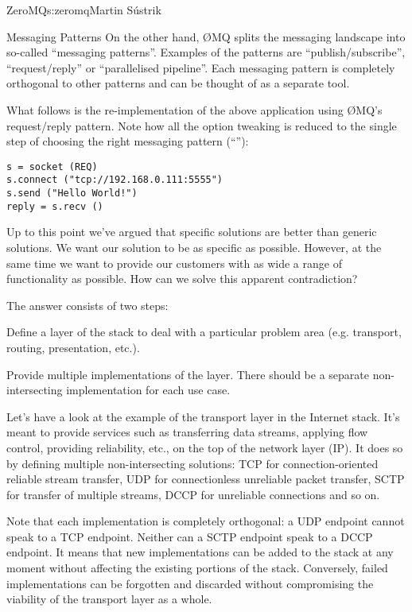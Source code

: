 \begin{aosachapter}{ZeroMQ}{s:zeromq}{Martin S\'{u}strik}
\begin{aosasect1}{Messaging Patterns}
On the other hand, {\O}MQ splits the messaging landscape into so-called ``messaging
patterns''. Examples of the patterns are ``publish/subscribe'',
``request/reply'' or ``parallelised pipeline''. Each messaging pattern
is completely orthogonal to other patterns and can be thought of as a
separate tool.

What follows is the re-implementation of the above application using
{\O}MQ's request/reply pattern. Note how all the option tweaking is
reduced to the single step of choosing the right messaging pattern
(``''):

\begin{verbatim}
s = socket (REQ)
s.connect ("tcp://192.168.0.111:5555")
s.send ("Hello World!")
reply = s.recv ()
\end{verbatim}

Up to this point we've argued that specific solutions are better than
generic solutions. We want our solution to be as specific as
possible. However, at the same time we want to provide our customers
with as wide a range of functionality as possible. How can we solve this
apparent contradiction?

The answer consists of two steps:

\begin{aosaenumerate}

\item Define a layer of the stack to deal with a particular problem
  area (e.g. transport, routing, presentation, etc.).

\item Provide multiple implementations of the layer. There should be a
  separate non-intersecting implementation for each use case.

\end{aosaenumerate}

Let's have a look at the example of the transport layer in the
Internet stack. It's meant to provide services such as transferring
data streams, applying flow control, providing reliability, etc., on the
top of the network layer (IP). It does so by defining multiple
non-intersecting solutions: TCP for connection-oriented reliable
stream transfer, UDP for connectionless unreliable packet transfer,
SCTP for transfer of multiple streams, DCCP for unreliable connections
and so on.

Note that each implementation is completely orthogonal: a UDP endpoint
cannot speak to a TCP endpoint. Neither can a SCTP endpoint speak to a DCCP
endpoint. It means that new implementations can be added to the stack
at any moment without affecting the existing portions of the
stack. Conversely, failed implementations can be forgotten and
discarded without compromising the viability of the transport layer as a
whole.


\end{aosasect1}
\end{aosachapter}
